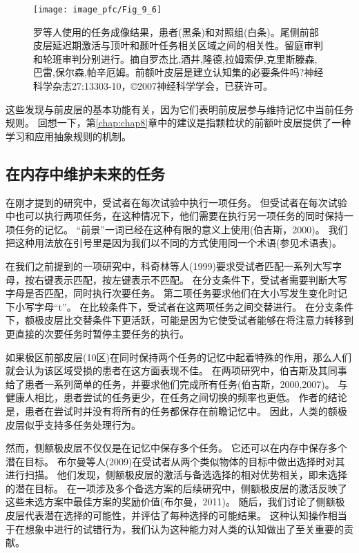 \begin{figure}[!htb]
	\centering
	\texttt{[image: image\_pfc/Fig\_9\_6]}
	\caption{罗等人使用的任务成像结果，患者(黑条)和对照组(白条)。尾侧前部皮层延迟期激活与顶叶和颞叶任务相关区域之间的相关性。留庭审判和轮班审判分别进行。摘自罗杰比,酒井,隆德,拉姆索伊,克里斯滕森,巴雷,保尔森,帕辛厄姆。前额叶皮层是建立认知集的必要条件吗?神经科学杂志27:13303-10，©2007神经科学学会，已获许可。\label{fig:fig_9_6}}
\end{figure}

\par

这些发现与前皮层的基本功能有关，因为它们表明前皮层参与维持记忆中当前任务规则。
回想一下，第\ref{chap:chap8}章中的建议是指颗粒状的前额叶皮层提供了一种学习和应用抽象规则的机制。



\subsection{在内存中维护未来的任务}
\par

在刚才提到的研究中，受试者在每次试验中执行一项任务。
但受试者在每次试验中也可以执行两项任务，在这种情况下，他们需要在执行另一项任务的同时保持一项任务的记忆。
“前景”一词已经在这种有限的意义上使用(伯吉斯，2000)。
我们把这种用法放在引号里是因为我们以不同的方式使用同一个术语(参见术语表)。
\par


在我们之前提到的一项研究中，科奇林等人(1999)要求受试者匹配一系列大写字母，按右键表示匹配，按左键表示不匹配。
在分支条件下，受试者需要判断大写字母是否匹配，同时执行次要任务。
第二项任务要求他们在大小写发生变化时记下小写字母“t”。
在比较条件下，受试者在这两项任务之间交替进行。
在分支条件下，额极皮层比交替条件下更活跃，可能是因为它使受试者能够在将注意力转移到更直接的次要任务时暂停主要任务的执行。
\par


如果极区前部皮层(10区)在同时保持两个任务的记忆中起着特殊的作用，那么人们就会认为该区域受损的患者在这方面表现不佳。
在两项研究中，伯吉斯及其同事给了患者一系列简单的任务，并要求他们完成所有任务(伯吉斯，2000,2007)。
与健康人相比，患者尝试的任务更少，在任务之间切换的频率也更低。
作者的结论是，患者在尝试时并没有将所有的任务都保存在前瞻记忆中。
因此，人类的额极皮层似乎支持多任务处理行为。
\par


然而，侧额极皮层不仅仅是在记忆中保存多个任务。
它还可以在内存中保存多个潜在目标。
布尔曼等人(2009)在受试者从两个类似物体的目标中做出选择时对其进行扫描。
他们发现，侧额极皮层的激活与备选选择的相对优势相关，即未选择的潜在目标。
在一项涉及多个备选方案的后续研究中，侧额极皮层的激活反映了这些未选方案中最佳方案的奖励价值(布尔曼，2011)。
随后，我们讨论了侧额极皮层代表潜在选择的可能性，并评估了每种选择的可能结果。
这种认知操作相当于在想象中进行的试错行为，我们认为这种能力对人类的认知做出了至关重要的贡献。
\par



